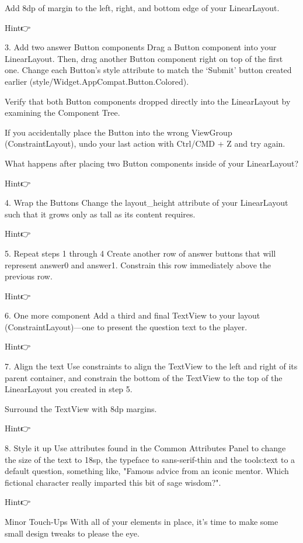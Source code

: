         Add 8dp of margin to the left, right, and bottom edge of your LinearLayout.

        Hint👉

    3. Add two answer Button components
        Drag a Button component into your LinearLayout. Then, drag another Button component right on top of the first one. Change each Button’s style attribute to match the ‘Submit’ button created earlier (style/Widget.AppCompat.Button.Colored).

        Verify that both Button components dropped directly into the LinearLayout by examining the Component Tree.

        If you accidentally place the Button into the wrong ViewGroup (ConstraintLayout), undo your last action with Ctrl/CMD + Z and try again.

        What happens after placing two Button components inside of your LinearLayout?

        Hint👉

    4. Wrap the Buttons
        Change the layout_height attribute of your LinearLayout such that it grows only as tall as its content requires.

        Hint👉

    5. Repeat steps 1 through 4
        Create another row of answer buttons that will represent answer0 and answer1. Constrain this row immediately above the previous row.

        Hint👉

    6. One more component
        Add a third and final TextView to your layout (ConstraintLayout)—one to present the question text to the player.

        Hint👉

    7. Align the text
        Use constraints to align the TextView to the left and right of its parent container, and constrain the bottom of the TextView to the top of the LinearLayout you created in step 5.

        Surround the TextView with 8dp margins.

        Hint👉

    8. Style it up
        Use attributes found in the Common Attributes Panel to change the size of the text to 18sp, the typeface to sans-serif-thin and the tools:text to a default question, something like, "Famous advice from an iconic mentor. Which fictional character really imparted this bit of sage wisdom?".

        Hint👉

    Minor Touch-Ups
        With all of your elements in place, it’s time to make some small design tweaks to please the eye.

